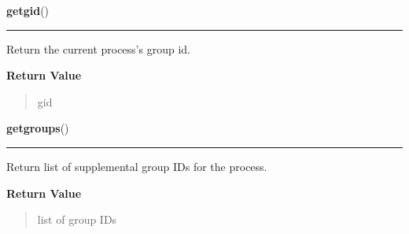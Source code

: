     \label{os:getgid}

    \vspace{0.5ex}

\hspace{.8\funcindent}\begin{boxedminipage}{\funcwidth}

    \raggedright \textbf{getgid}()

    \vspace{-1.5ex}

    \rule{\textwidth}{0.5\fboxrule}
\setlength{\parskip}{2ex}
    Return the current process's group id.

\setlength{\parskip}{1ex}
      \textbf{Return Value}
    \vspace{-1ex}

      \begin{quote}
      gid

      \end{quote}

    \end{boxedminipage}

    \label{os:getgroups}

    \vspace{0.5ex}

\hspace{.8\funcindent}\begin{boxedminipage}{\funcwidth}

    \raggedright \textbf{getgroups}()

    \vspace{-1.5ex}

    \rule{\textwidth}{0.5\fboxrule}
\setlength{\parskip}{2ex}
    Return list of supplemental group IDs for the process.

\setlength{\parskip}{1ex}
      \textbf{Return Value}
    \vspace{-1ex}

      \begin{quote}
      list of group IDs

      \end{quote}

    \end{boxedminipage}

    \label{os:getloadavg}

    \vspace{0.5ex}

